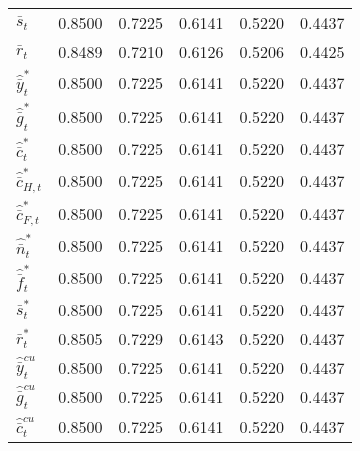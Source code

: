 \begin{center}
\begin{longtable}{lccccc}
${\bar s_t}               $	 & 	            0.8500	 & 	            0.7225	 & 	            0.6141	 & 	            0.5220	 & 	            0.4437 \\ 
${\bar r_t}               $	 & 	            0.8489	 & 	            0.7210	 & 	            0.6126	 & 	            0.5206	 & 	            0.4425 \\ 
${\hat {\bar y}_t^*}      $	 & 	            0.8500	 & 	            0.7225	 & 	            0.6141	 & 	            0.5220	 & 	            0.4437 \\ 
${\hat {\bar g}_t^*}      $	 & 	            0.8500	 & 	            0.7225	 & 	            0.6141	 & 	            0.5220	 & 	            0.4437 \\ 
${\hat {\bar c}_t^*}      $	 & 	            0.8500	 & 	            0.7225	 & 	            0.6141	 & 	            0.5220	 & 	            0.4437 \\ 
${\hat {\bar c}_{H,t}^*}  $	 & 	            0.8500	 & 	            0.7225	 & 	            0.6141	 & 	            0.5220	 & 	            0.4437 \\ 
${\hat {\bar c}_{F,t}^*}  $	 & 	            0.8500	 & 	            0.7225	 & 	            0.6141	 & 	            0.5220	 & 	            0.4437 \\ 
${\hat {\bar n}_t^*}      $	 & 	            0.8500	 & 	            0.7225	 & 	            0.6141	 & 	            0.5220	 & 	            0.4437 \\ 
${\hat {\bar f}_t^*}      $	 & 	            0.8500	 & 	            0.7225	 & 	            0.6141	 & 	            0.5220	 & 	            0.4437 \\ 
${\bar s_t^*}             $	 & 	            0.8500	 & 	            0.7225	 & 	            0.6141	 & 	            0.5220	 & 	            0.4437 \\ 
${\bar r_t^*}             $	 & 	            0.8505	 & 	            0.7229	 & 	            0.6143	 & 	            0.5220	 & 	            0.4437 \\ 
${\hat {\bar y}_t^{cu}}   $	 & 	            0.8500	 & 	            0.7225	 & 	            0.6141	 & 	            0.5220	 & 	            0.4437 \\ 
${\hat {\bar g}_t^{cu}}   $	 & 	            0.8500	 & 	            0.7225	 & 	            0.6141	 & 	            0.5220	 & 	            0.4437 \\ 
${\hat {\bar c}_t^{cu}}   $	 & 	            0.8500	 & 	            0.7225	 & 	            0.6141	 & 	            0.5220	 & 	            0.4437 \\ 

\end{longtable}
\end{center}
